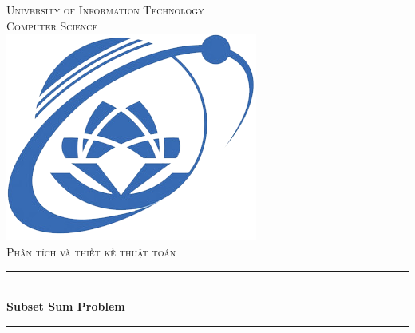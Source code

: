 \documentclass{article}
\begin{document}
\begin{titlepage}

\newcommand{\HRule}{\rule{\linewidth}{0.5mm}} %

\center %
 

\textsc{\LARGE University of Information Technology}\\[1.5cm] %
\textsc{\Large Computer Science}\\[0.5cm] %

\includegraphics{logo.png}\\[1cm] %
 
\textsc{\large Phân tích và thiết kế thuật toán}\\[0.5cm] %


\HRule \\[0.4cm]
{ \huge \bfseries Subset Sum Problem}\\[0.6cm] %
\HRule \\[1.0cm]


\end{titlepage}
\end{document}
